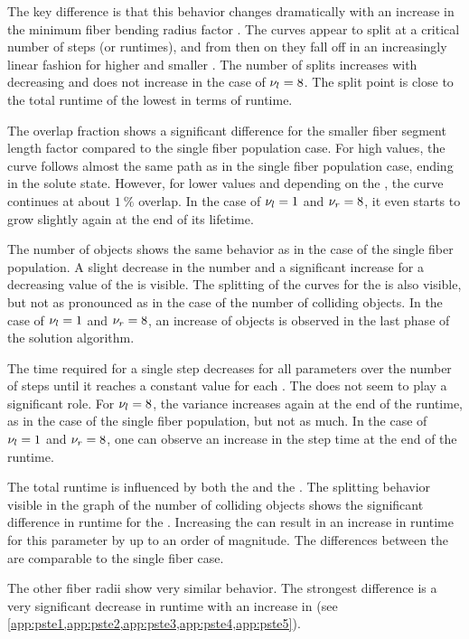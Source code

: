 The key difference is that this behavior changes dramatically with an increase in the minimum fiber bending radius factor \segRadiusFactor{}.
The curves appear to split at a critical number of steps (or runtimes), and from then on they fall off in an increasingly linear fashion for higher \segRadiusFactor{} and smaller \segLengthFactor{}.
The number of splits increases with decreasing \segLengthFactor{} and does not increase in the case of $\textnormal{$\nu_{l}$} = \SI{8}{}$.
The split point is close to the total runtime of the lowest \segRadiusFactor{} in terms of runtime.
\par
%
The overlap fraction shows a significant difference for the smaller fiber segment length factor \segLengthFactor{} compared to the single fiber population case.
For high \segLengthFactor{} values, the curve follows almost the same path as in the single fiber population case, ending in the solute state.
However, for lower values and depending on the \segRadius{}, the curve continues at about $\SI{1}{\percent}$ overlap.
In the case of $\textnormal{$\nu_{l}$} = \SI{1}{}$ and $\textnormal{$\nu_{r}$} = \SI{8}{}$, it even starts to grow slightly again at the end of its lifetime.
\par
%
The number of objects shows the same behavior as in the case of the single fiber population.
A slight decrease in the number and a significant increase for a decreasing value of the \segLengthFactor{} is visible.
The splitting of the curves for the \segRadiusFactor{} is also visible, but not as pronounced as in the case of the number of colliding objects.
In the case of $\textnormal{$\nu_{l}$} = \SI{1}{}$ and $\textnormal{$\nu_{r}$} = \SI{8}{}$, an increase of objects is observed in the last phase of the solution algorithm.
\par
% 
The time required for a single step decreases for all parameters over the number of steps until it reaches a constant value for each \segLengthFactor{}.
The \segRadiusFactor{} does not seem to play a significant role.
For $\textnormal{$\nu_{l}$}{} = \SI{8}{}$, the variance increases again at the end of the runtime, as in the case of the single fiber population, but not as much.
In the case of $\textnormal{$\nu_{l}$}{} = \SI{1}{}$ and $\textnormal{$\nu_{r}$} = \SI{8}{}$, one can observe an increase in the step time at the end of the runtime.
\par
%
The total runtime is influenced by both the \segLengthFactor{} and the \segRadiusFactor{}.
The splitting behavior visible in the graph of the number of colliding objects shows the significant difference in runtime for the \segRadiusFactor{}.
Increasing the \segRadiusFactor{} can result in an increase in runtime for this parameter by up to an order of magnitude.
The differences between the \segLengthFactor{} are comparable to the single fiber case.
\par
%
The other fiber radii show very similar behavior.
The strongest difference is a very significant decrease in runtime with an increase in \fiberRadiusMean{} (see \cref{app:pste1,app:pste2,app:pste3,app:pste4,app:pste5}).
%
%
%
